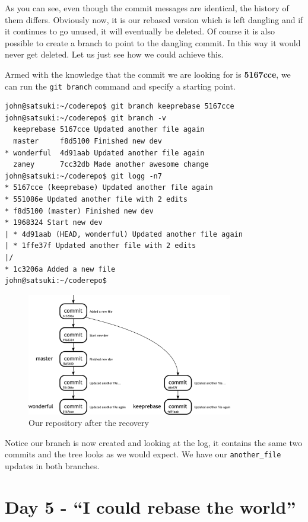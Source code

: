 As you can see, even though the commit messages are identical, the history of them differs.
Obviously now, it is our rebased version which is left dangling and if it continues to go unused, it will eventually be deleted.
Of course it is also possible to create a branch to point to the dangling commit.
In this way it would never get deleted.
Let us just see how we could achieve this.

Armed with the knowledge that the commit we are looking for is \textbf{5167cce}, we can run the \texttt{git branch} command and specify a starting point.

\begin{Verbatim}
john@satsuki:~/coderepo$ git branch keeprebase 5167cce
john@satsuki:~/coderepo$ git branch -v
  keeprebase 5167cce Updated another file again
  master     f8d5100 Finished new dev
* wonderful  4d91aab Updated another file again
  zaney      7cc32db Made another awesome change
john@satsuki:~/coderepo$ git logg -n7
* 5167cce (keeprebase) Updated another file again
* 551086e Updated another file with 2 edits
* f8d5100 (master) Finished new dev
* 1968324 Start new dev
| * 4d91aab (HEAD, wonderful) Updated another file again
| * 1ffe37f Updated another file with 2 edits
|/
* 1c3206a Added a new file
john@satsuki:~/coderepo$
\end{Verbatim}

\begin{figure}[hbt]
\centering
\includegraphics[width=9cm]{images/f-w7-d7.pdf}
\caption{Our repository after the recovery}
\end{figure}

Notice our branch is now created and looking at the log, it contains the same two commits and the tree looks as we would expect.
We have our \texttt{another\_file} updates in both branches.

\section{Day 5 - ``I could rebase the world''}
